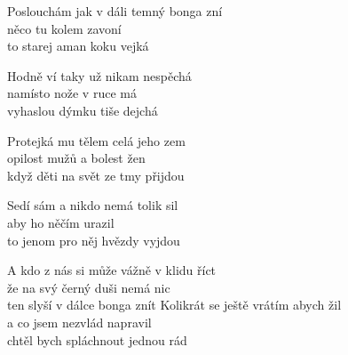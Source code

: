 
\ve{}
Poslouchám jak v dáli temný bonga zní\\
něco tu kolem zavoní\\
to starej aman koku vejká

\ve{}
Hodně ví taky už nikam nespěchá\\
namísto nože v ruce má\\
vyhaslou dýmku tiše dejchá

\ve{}
Protejká mu tělem celá jeho zem\\
opilost mužů a bolest žen\\
když děti na svět ze tmy přijdou

\ve{}
Sedí sám a nikdo nemá tolik sil\\
aby ho něčím urazil\\
to jenom pro něj hvězdy vyjdou

\ve{}
A kdo z nás si může vážně v klidu říct\\
že na svý černý duši nemá nic\\
ten slyší v dálce bonga znít
\ve{}
Kolikrát se ještě vrátím abych žil\\
a co jsem nezvlád napravil\\
chtěl bych spláchnout jednou rád

\esong